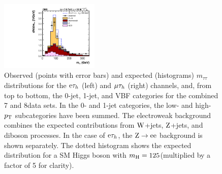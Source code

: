 \documentclass[11pt,twoside,a4paper,cmspaper,final,collab]{cms-tdr}
\begin{document}
\begin{figure}[htbp]
\begin{center}
\includegraphics[width=0.42\textwidth]{figures/htt/muTau_vbf_rescaled_7and8TeV.pdf}
\end{center}
\caption{Observed (points with error bars) and expected (histograms) $m_{\tau\tau}$ distributions for the $\mathrm{e}\tau_h$ (left) and $\mu\tau_h$ (right) channels, and,
from top to bottom, the 0-jet, 1-jet, and VBF categories for the combined 7 and 8\TeV data sets.
In the 0- and 1-jet categories, the low- and high-$p_{\mathrm{T}}$ subcategories have been summed.
The electroweak background combines the expected contributions from $\mathrm{W}$+jets, $\mathrm{Z}$+jets, and diboson processes.
In the case of $\mathrm{e}\tau_h$, the $\mathrm{Z}\to\mathrm{e}\mathrm{e}$ background is shown separately. The dotted histogram shows the expected distribution for a SM Higgs boson with $m_{\mathrm{H}}=125$\GeV (multiplied by a factor of 5 for clarity).
}
\label{fig:htt_mtt_leptau}
\end{figure}
\end{document}
